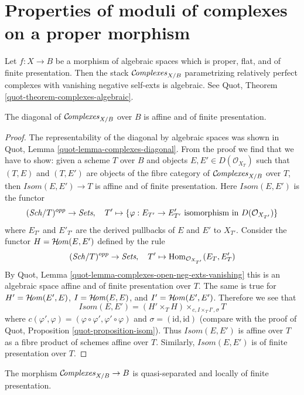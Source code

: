 \section{Properties of moduli of complexes on a proper morphism}
\label{section-complexes}

\noindent
Let $f : X \to B$ be a morphism of algebraic spaces which is proper,
flat, and of finite presentation. Then the stack
$\mathcal{C}\!\mathit{omplexes}_{X/B}$ parametrizing relatively perfect complexes
with vanishing negative self-exts is algebraic. See
Quot, Theorem \ref{quot-theorem-complexes-algebraic}.

\begin{lemma}
\label{lemma-complexes-diagonal-affine-fp}
The diagonal of $\mathcal{C}\!\mathit{omplexes}_{X/B}$ over $B$ is affine
and of finite presentation.
\end{lemma}

\begin{proof}
The representability of the diagonal by algebraic spaces
was shown in Quot, Lemma \ref{quot-lemma-complexes-diagonal}.
From the proof we find that we have to show:
given a scheme $T$ over $B$ and objects
$E, E' \in D(\mathcal{O}_{X_T})$ such that
$(T, E)$ and $(T, E')$ are objects of the fibre category
of $\mathcal{C}\!\mathit{omplexes}_{X/B}$ over $T$, then
$\mathit{Isom}(E, E') \to T$
is affine and of finite presentation.
Here $\mathit{Isom}(E, E')$ is the functor
$$
(\mathit{Sch}/T)^{opp} \to \textit{Sets},\quad
T' \mapsto \{\varphi : E_{T'} \to E'_{T'}
\text{ isomorphism in }D(\mathcal{O}_{X_{T'}})\}
$$
where $E_{T'}$ and $E'_{T'}$ are the derived pullbacks of $E$ and $E'$
to $X_{T'}$. Consider the functor $H = \mathop{\mathcal{H}\!\mathit{om}}\nolimits(E, E')$ defined
by the rule
$$
(\mathit{Sch}/T)^{opp} \to \textit{Sets},\quad
T' \mapsto \mathop{\mathrm{Hom}}\nolimits_{\mathcal{O}_{X_{T'}}}(E_T, E'_T)
$$
By Quot, Lemma \ref{quot-lemma-complexes-open-neg-exts-vanishing}
this is an algebraic space affine and of finite presentation over $T$.
The same is true for $H' = \mathop{\mathcal{H}\!\mathit{om}}\nolimits(E', E)$, $I = \mathop{\mathcal{H}\!\mathit{om}}\nolimits(E, E)$, and
$I' = \mathop{\mathcal{H}\!\mathit{om}}\nolimits(E', E')$. Therefore we see that
$$
\mathit{Isom}(E, E') = (H' \times_T H) \times_{c, I \times_T I', \sigma} T
$$
where $c(\varphi', \varphi) = (\varphi \circ \varphi', \varphi' \circ \varphi)$
and $\sigma = (\text{id}, \text{id})$ (compare with the proof of
Quot, Proposition \ref{quot-proposition-isom}). Thus
$\mathit{Isom}(E, E')$ is affine over $T$ as a fibre product of
schemes affine over $T$. Similarly, $\mathit{Isom}(E, E')$ is
of finite presentation over $T$.
\end{proof}

\begin{lemma}
\label{lemma-complexes-qs-lfp}
The morphism $\mathcal{C}\!\mathit{omplexes}_{X/B} \to B$ is quasi-separated and
locally of finite presentation.
\end{lemma}

